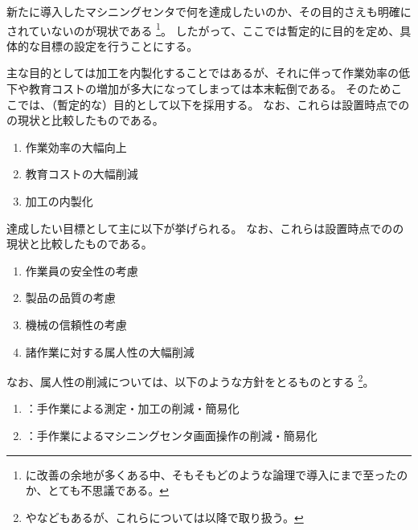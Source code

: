 

新たに導入したマシニングセンタで何を達成したいのか、その目的さえも明確にされていないのが現状である
\footnote{\MMC に改善の余地が多くある中、そもそもどのような論理で導入にまで至ったのか、とても不思議である。}。
したがって、ここでは暫定的に目的を定め、具体的な目標の設定を行うことにする。



主な目的としては\Dimple 加工を内製化することではあるが、それに伴って作業効率の低下や教育コストの増加が多大になってしまっては本末転倒である。
そのためここでは、（暫定的な）目的として以下を採用する。
なお、これらは\DMC 設置時点での\MMC の現状と比較したものである。
\begin{enumerate}[label=\sarrow]
\item 作業効率の大幅向上
\item 教育コストの大幅削減
\item \Dimple 加工の内製化
\end{enumerate}



達成したい目標として主に以下が挙げられる。
なお、これらは\DMC 設置時点での\MMC の現状と比較したものである。
\begin{enumerate}[label=\sarrow]
\item 作業員の安全性の考慮
\item 製品の品質の考慮
\item 機械の信頼性の考慮
\item 諸作業に対する属人性の大幅削減
\end{enumerate}
なお、属人性の削減については、以下のような方針をとるものとする
\footnote{やなどもあるが、これらについては以降で取り扱う。}。
\begin{enumerate}[label=\sarrow]
\item {}：手作業による測定・加工の削減・簡易化
\item {}：手作業によるマシニングセンタ画面操作の削減・簡易化
\end{enumerate}


